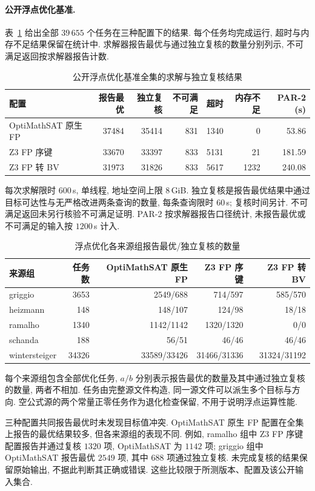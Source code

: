 \paragraph{公开浮点优化基准.}
表~\ref{tab:exp-public-fp-full} 给出全部 $39\,655$ 个任务在三种配置下的结果. 每个任务均完成运行, 超时与内存不足结果保留在统计中. 求解器报告最优与通过独立复核的数量分别列示, 不可满足返回按求解器报告计数.

\begin{table}[!ht]
\centering
\caption{公开浮点优化基准全集的求解与独立复核结果}
\label{tab:exp-public-fp-full}
\small
\begin{tabular}{@{}l rrrrr r@{}}
\toprule
配置 & 报告最优 & 独立复核 & 不可满足 & 超时 & 内存不足 & PAR-2 (s) \\
\midrule
OptiMathSAT 原生 FP & 37484 & 35414 & 831 & 1340 & 0 & 53.86 \\
Z3 FP 序键 & 33670 & 33397 & 833 & 5131 & 21 & 181.59 \\
Z3 FP 转 BV & 31973 & 31826 & 833 & 5617 & 1232 & 240.08 \\
\bottomrule
\end{tabular}
\par\smallskip
\begin{minipage}{\linewidth}\footnotesize 每次求解限时 $600$\,s, 单线程, 地址空间上限 $8$\,GiB. 独立复核是报告最优结果中通过目标可达性与无严格改进两条查询的数量, 每条查询限时 $60$\,s; 复核时间另计. 不可满足返回未另行核验不可满足证明. PAR-2 按求解器报告口径统计, 未报告最优或不可满足的输入按 $1200$\,s 计入.
\end{minipage}
\end{table}

\begin{table}[!ht]
\centering
\caption{浮点优化各来源组报告最优/独立复核的数量}
\label{tab:exp-public-fp-groups}
\small
\begin{tabular}{@{}l r rrr@{}}
\toprule
来源组 & 任务数 & OptiMathSAT 原生 FP & Z3 FP 序键 & Z3 FP 转 BV \\
\midrule
griggio & 3653 & 2549/688 & 714/597 & 585/570 \\
heizmann & 148 & 148/107 & 124/98 & 18/18 \\
ramalho & 1340 & 1142/1142 & 1320/1320 & 0/0 \\
schanda & 188 & 56/51 & 46/46 & 46/46 \\
wintersteiger & 34326 & 33589/33426 & 31466/31336 & 31324/31192 \\
\bottomrule
\end{tabular}
\par\smallskip
\begin{minipage}{\linewidth}\footnotesize 每个来源组包含全部优化任务, $a/b$ 分别表示报告最优的数量及其中通过独立复核的数量, 两者不相加. 任务由完整源文件构造, 同一源文件可以派生多个目标与方向. 空公式源的两个常量正零任务作为退化检查保留, 不用于说明浮点运算性能.
\end{minipage}
\end{table}

三种配置共同报告最优时未发现目标值冲突. OptiMathSAT 原生 FP 配置在全集上报告的最优结果较多, 但各来源组的表现不同. 例如, ramalho 组中 Z3 FP 序键配置报告并通过复核 $1320$ 项, OptiMathSAT 为 $1142$ 项; griggio 组中 OptiMathSAT 报告最优 $2549$ 项, 其中 $688$ 项通过独立复核. 未完成复核的结果保留原始输出, 不据此判断其正确或错误. 这些比较限于所测版本、配置及该公开输入集合.
